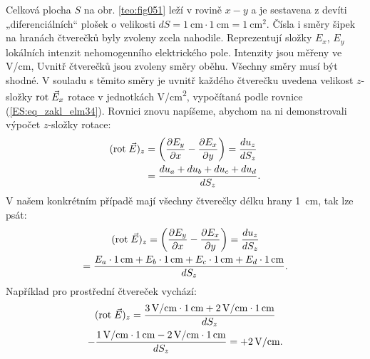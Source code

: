 \begin{mdframed}[style=mdexam]
\begin{example}\label{TEO:exam014}
  Celková plocha \(S\) na obr. \ref{teo:fig051} leží v rovině \(x-y\) a je 
  sestavena z devíti „diferenciálních“ plošek o velikosti \(dS = \SI{1}{\cm} \cdot \SI{1}{\cm} = 
  \SI{1}{\cm^2}\). Čísla i směry šipek na hranách čtverečků byly zvoleny zcela nahodile. 
  Reprezentují složky \(E_x\), \(E_y\) lokálních intenzit nehomogenního elektrického pole. 
  Intenzity jsou měřeny ve \si{V/\cm}, Uvnitř čtverečků jsou zvoleny směry oběhu. Všechny směry 
  musí být shodné. V souladu s těmito směry je uvnitř každého čtverečku uvedena velikost 
  \(z\)-složky \(\mathrm{rot}\;\vec{E}_x\) rotace v jednotkách \si{V/\cm^2}, vypočítaná podle rovnice 
  (\ref{ES:eq_zakl_elm34}). Rovnici znovu napíšeme, abychom na ni demonstrovali výpočet 
  \(z\)-složky rotace:
  \begin{align*}
    (\mathrm{rot}\;\vec{E})_z   &= \left(\dfrac{\partial E_y}{\partial x} - \dfrac{\partial E_x}{\partial y}\right)                  
                  = \frac{du_z}{dS_z}                             \\
                  &= \frac{du_a + du_b + du_c + du_d}{dS_z}.
  \end{align*}
  V našem konkrétním případě mají všechny čtverečky délku hrany \SI{1}{\cm}, tak lze psát:
  \begin{multline*}
    (\rot{E})_z = \left(\pder{E_y}{x} - \pder{E_x}{y}\right)
                = \frac{du_z}{dS_z}                                          \\
                = \frac{E_a\cdot\SI{1}{\cm} + E_b\cdot\SI{1}{\cm} + 
                    E_c\cdot\SI{1}{\cm} + E_d\cdot\SI{1}{\cm}}{dS_z}.
  \end{multline*}
  Například pro prostřední čtvereček vychází:
  \begin{multline*}
    (\rot{E})_z 
      = \frac{\SI{3}{V/\cm}\cdot\SI{1}{\cm} + \SI{2}{V/\cm}\cdot\SI{1}{\cm}}{dS_z}  \\
      - \frac{\SI{1}{V/\cm}\cdot\SI{1}{\cm} - \SI{2}{V/\cm}\cdot\SI{1}{\cm}}{dS_z} 
      = + \SI{2}{V/\cm}.
  \end{multline*}
  
   {\centering
    \captionsetup{type=figure}
    \label{teo:fig051}
  \par}
  

\end{example}
\end{mdframed}
